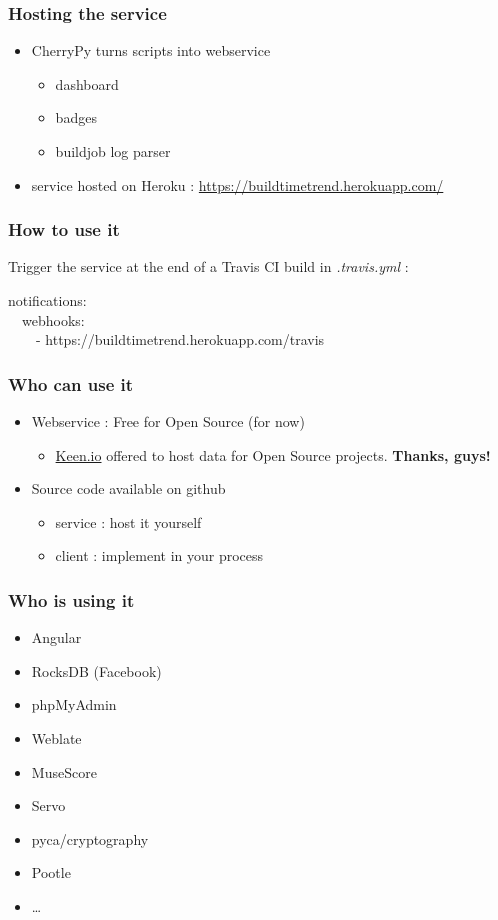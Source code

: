 \documentclass[14pt]{beamer}
\begin{document}
  \begin{frame}
    \frametitle{Hosting the service}
    \begin{itemize}
      \item CherryPy turns scripts into webservice
        \begin{itemize}
          \item dashboard
          \item badges
          \item buildjob log parser
        \end{itemize}
      \item service hosted on Heroku : \href{https://buildtimetrend.herokuapp.com/}{https://buildtimetrend.herokuapp.com/}
    \end{itemize}
  \end{frame}
  \begin{frame}
    \frametitle{How to use it}
    Trigger the service at the end of a Travis CI build in \textit{.travis.yml} :
    \begin{example}
      \small{notifications:\\
      \ \ webhooks:\\
      \ \ \ \ - https://buildtimetrend.herokuapp.com/travis}
    \end{example}
  \end{frame}
  \begin{frame}
    \frametitle{Who can use it}
    \begin{itemize}
      \item Webservice : Free for Open Source (for now)
      \begin{itemize}
        \item \href{https://keen.io}{Keen.io} offered to host data for Open Source projects. \textbf{Thanks, guys!}
      \end{itemize}
      \item Source code available on github
      \begin{itemize}
        \item service : host it yourself
        \item client : implement in your process
      \end{itemize}
    \end{itemize}
  \end{frame}
  \begin{frame}
    \frametitle{Who is using it}
    \begin{itemize}
      \item Angular
      \item RocksDB (Facebook)
      \item phpMyAdmin
      \item Weblate
      \item MuseScore
      \item Servo
      \item pyca/cryptography
      \item Pootle
      \item \ldots
    \end{itemize}
  \end{frame}
\end{document}
